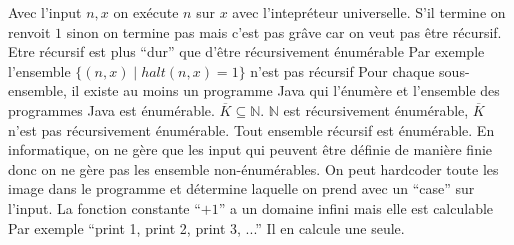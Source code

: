 \begin{mcqs}
  {Avec l'input $n,x$ on exécute $n$ sur $x$ avec l'intepréteur universelle.
  S'il termine on renvoit $1$ sinon on termine pas mais c'est pas grâve car on veut pas être récursif.}
  {Etre récursif est plus ``dur'' que d'être récursivement énumérable}
  {Par exemple l'ensemble $\{(n,x) \mid \mathit{halt}(n,x)=1\}$ n'est pas récursif}
  {Pour chaque sous-ensemble, il existe au moins un programme Java qui l'énumère et l'ensemble des programmes Java est énumérable.}
  {$\overline{K} \subseteq \mathbb{N}$. $\mathbb{N}$ est récursivement énumérable, $\overline{K}$ n'est pas récursivement énumérable.}
  {Tout ensemble récursif est énumérable. En informatique, on ne gère que les input qui peuvent être définie de manière finie
  donc on ne gère pas les ensemble non-énumérables.}
  {On peut hardcoder toute les image dans le programme et détermine laquelle on prend avec un ``case'' sur l'input.}
  {La fonction constante ``$+1$'' a un domaine infini mais elle est calculable}
  {Par exemple ``print 1, print 2, print 3, ...''}
  {Il en calcule une seule.}
\end{mcqs}

